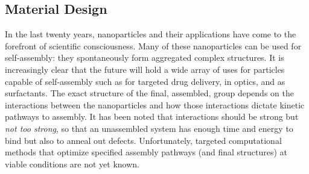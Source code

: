 \documentclass[11pt]{article}
\begin{document}


\subsection*{Material Design}

In the last twenty years, nanoparticles and their applications have come to the forefront of scientific consciousness.
Many of these nanoparticles can be used for self-assembly: they spontaneously form aggregated complex structures.  It is increasingly clear that the future will hold a wide array of uses for particles capable of self-assembly such as for targeted drug delivery,
in optics,
and as surfactants.
The exact structure of the final, assembled, group depends on the interactions between the nanoparticles and how those interactions dictate kinetic pathways to assembly. It has been noted that interactions should be strong but {\it not too strong}, so that an unassembled system has enough time and energy to bind but also to anneal out defects.
Unfortunately, targeted computational methods that optimize specified assembly pathways (and final structures) at viable conditions are not yet known. 
\end{document}
